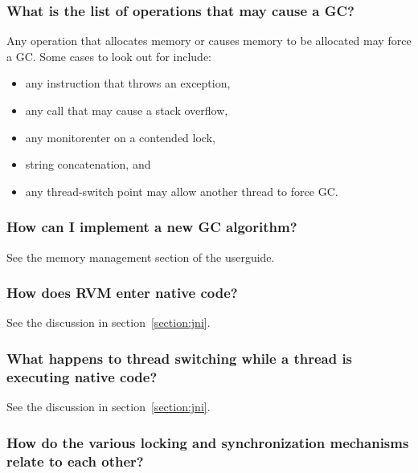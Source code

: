 \subsubsection{What is the list of operations that may cause a GC?}

Any operation that allocates memory or causes memory to be allocated may
force a GC.  Some cases to look out for include:
\begin{itemize}
\item any instruction that throws an exception,
\item any call that may cause a stack overflow,
\item any monitorenter on a contended lock,
\item string concatenation, and
\item any thread-switch point may allow another thread to force GC.
\end{itemize}

\subsubsection{How can I implement a new GC algorithm?}

See the memory management section of the userguide.

\subsubsection{How does RVM enter native code?}

See the discussion in section~\ref{section:jni}. 

\subsubsection{What happens to thread switching while a thread is
executing native code?}
See the discussion in section~\ref{section:jni}. 

\subsubsection{How do the various locking and synchronization mechanisms
relate to each other?}

